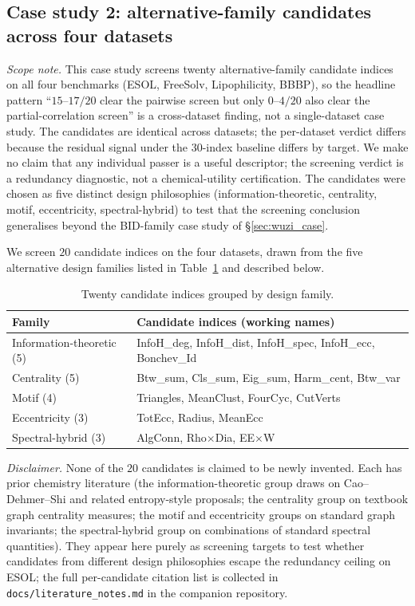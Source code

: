 \documentclass[STIX1COL]{WileyNJDv5}
\theoremstyle{definition}
\begin{document}
\subsection{Case study 2: alternative-family candidates across four datasets}\label{sec:novel_case}

\noindent\emph{Scope note.} This case study screens twenty
alternative-family candidate indices on all four benchmarks
(ESOL, FreeSolv, Lipophilicity, BBBP), so the headline pattern
``$15$--$17/20$ clear the pairwise screen but only $0$--$4/20$
also clear the partial-correlation screen'' is a cross-dataset
finding, not a single-dataset case study. The candidates are
identical across datasets; the per-dataset verdict differs because
the residual signal under the $30$-index baseline differs by
target. We make no claim that any individual passer is a useful
descriptor; the screening verdict is a redundancy diagnostic, not
a chemical-utility certification. The candidates were chosen as
five distinct design philosophies (information-theoretic,
centrality, motif, eccentricity, spectral-hybrid) to test that
the screening conclusion generalises beyond the BID-family case
study of \S\ref{sec:wuzi_case}.

We screen $20$ candidate indices on the four datasets, drawn from
the five alternative design families listed in
Table~\ref{tab:candidates} and described below.

\begin{table}[h]
\centering
\caption{Twenty candidate indices grouped by design family.}
\label{tab:candidates}
\begin{tabular}{ll}
\toprule
Family & Candidate indices (working names)\\
\midrule
Information-theoretic (5) & InfoH\_deg, InfoH\_dist, InfoH\_spec, InfoH\_ecc, Bonchev\_Id\\
Centrality (5) & Btw\_sum, Cls\_sum, Eig\_sum, Harm\_cent, Btw\_var\\
Motif (4) & Triangles, MeanClust, FourCyc, CutVerts\\
Eccentricity (3) & TotEcc, Radius, MeanEcc\\
Spectral-hybrid (3) & AlgConn, Rho$\times$Dia, EE$\times$W\\
\bottomrule
\end{tabular}
\end{table}

\noindent\emph{Disclaimer.} None of the $20$ candidates is claimed
to be newly invented. Each has prior chemistry literature (the
information-theoretic group draws on Cao--Dehmer--Shi and related
entropy-style proposals; the centrality group on textbook graph
centrality measures; the motif and eccentricity groups on
standard graph invariants; the spectral-hybrid group on
combinations of standard spectral quantities). They appear here
purely as screening targets to test whether candidates from
different design philosophies escape the redundancy ceiling on
ESOL; the full per-candidate citation list is collected in
\texttt{docs/literature\_notes.md} in the companion repository.
\end{document}

